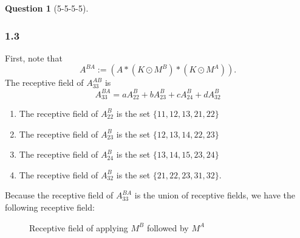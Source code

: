 \documentclass[12pt]{article}
\theoremstyle{definition}
\newtheorem{exercise}{Question}%
\begin{document}
\begin{exercise}[5-5-5-5]
{  \subsubsection*{1.3}
  First, note that
    \begin{equation}
      A^{BA} := (A * (K \odot M^{B}) * (K \odot M^{A})).
      \label{aaa}
    \end{equation}
    The receptive field of $A_{33}^{AB}$ is
    \begin{equation}
      A^{BA}_{33} = aA^{B}_{22} +  b A^{B}_{23} + c   A^{B}_{24} + d A^{B}_{32}
    \label{eqaa}
    \end{equation}
    \begin{enumerate}
        \item The receptive field of  $A^{B}_{22}$ is the set
            $\{11, 12 ,13, 21, 22\}$
        \item The receptive field of  $A^{B}_{23}$ is the set
            $\{12, 13 ,14, 22, 23\}$
        \item The receptive field of  $A^{B}_{24}$ is the set
            $\{13, 14 ,15, 23, 24\}$
        \item The receptive field of  $A^{B}_{32}$ is the set
            $\{21, 22, 23, 31, 32\}$.
    \end{enumerate}
    Because the receptive field of $A^{BA}_{33}$ is the union of receptive fields, we have the
    following receptive field:
    \begin{figure}[h]
    \centering
    \caption{Receptive field of applying $M^{B}$ followed by $M^{A}$}
    \label{fig:pixcnn5}
    \end{figure}

}
\end{exercise}
\end{document}
